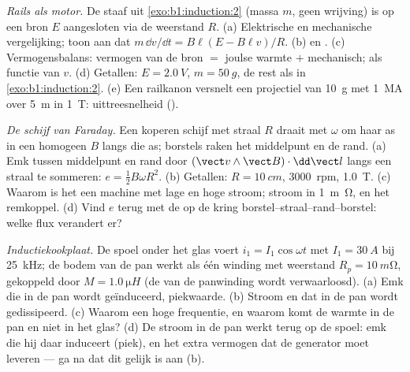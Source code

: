 \begin{exercise}[$\star\star\star$]\label{exo:b1:induction:10}
\emph{Rails als motor.} De staaf uit \cref{exo:b1:induction:2} (massa $m$,
geen wrijving) is op een bron $E$ aangesloten via de weerstand $R$.
(a) Elektrische en mechanische vergelijking; toon aan dat $m\,\dd v/\dd t = B\ell(E -
B\ell v)/R$. (b)  en . (c) Vermogensbalans:
vermogen van de bron $=$ joulse warmte $+$ mechanisch;  als functie van
$v$. (d) Getallen: $E = \qty{2.0}{V}$, $m = \qty{50}{g}$, de rest als in
\cref{exo:b1:induction:2}. (e) Een railkanon versnelt een projectiel van
\qty{10}{g} met \qty{1}{MA} over \qty{5}{m} in \qty{1}{T}: uittreesnelheid
().
\end{exercise}

\begin{exercise}[$\star\star\star$]\label{exo:b1:induction:11}
\emph{De schijf van Faraday.} Een koperen schijf met straal $R$ draait met $\omega$
om haar as in een homogeen $B$ langs die as; borstels raken het middelpunt
en de rand. (a) Emk tussen middelpunt en rand door $(\vect v\wedge
\vect B)\cdot\dd\vect l$ langs een straal te sommeren: $e = \tfrac12B\omega R^2$. (b) Getallen:
$R = \qty{10}{cm}$, \qty{3000}{rpm}, \qty{1.0}{T}. (c) Waarom is het een
machine met lage  en hoge stroom; stroom in \qty{1}{m\ohm}, en het
remkoppel. (d) Vind $e$ terug met de  op de
kring borstel--straal--rand--borstel: welke flux verandert er?
\end{exercise}

\begin{exercise}[$\star\star\star$]\label{exo:b1:induction:12}
\emph{Inductiekookplaat.} De spoel onder het glas voert $i_1 =
I_1\cos\omega t$ met $I_1 = \qty{30}{A}$ bij \qty{25}{kHz}; de bodem van de pan
werkt als één winding met weerstand $R_p = \qty{10}{m\ohm}$, gekoppeld door
$M = \qty{1.0}{\micro H}$ (de  van de panwinding wordt verwaarloosd). (a) Emk
die in de pan wordt geïnduceerd, piekwaarde. (b) Stroom en  dat
in de pan wordt gedissipeerd. (c) Waarom een hoge frequentie, en waarom komt de warmte in
de pan en niet in het glas? (d) De stroom in de pan werkt terug op de spoel:
emk die hij daar induceert (piek), en het extra vermogen dat de generator moet
leveren --- ga na dat dit gelijk is aan (b).
\end{exercise}

